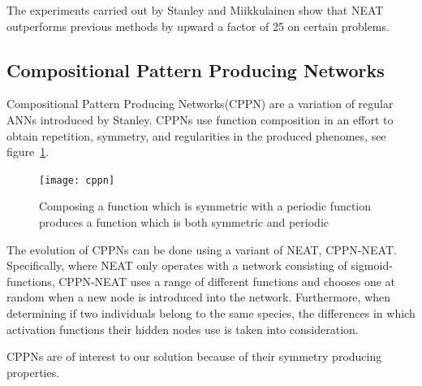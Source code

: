 The experiments carried out by Stanley and Miikkulainen show that NEAT 
outperforms previous methods by upward a factor of 
25 on certain problems\cite[p.~2]{stanley2002evolving}.
\subsection{Compositional Pattern Producing Networks}
\label{sec:cppn}
Compositional Pattern Producing Networks(CPPN) are a variation of regular ANNs 
introduced by 
Stanley\cite{Stanley2007}.
CPPNs use function composition in an effort to obtain repetition, symmetry, and 
regularities in the produced phenomes, see figure~\ref{fig:cppn}.
\begin{figure}[ht]
\centering
\texttt{[image: cppn]}
\caption{Composing a function which is symmetric with a periodic function 
produces a function which is both symmetric and periodic \cite{Stanley2007}}
\label{fig:cppn}
\end{figure}

The evolution of CPPNs can be done using a variant of NEAT, 
CPPN-NEAT.
Specifically, where NEAT only operates with a network consisting of 
sigmoid-functions, CPPN-NEAT uses a range of different functions and chooses 
one at random when a new node is introduced into the network.
Furthermore, when determining if two individuals belong to the same species, 
the differences in which activation functions their hidden nodes use is taken 
into consideration.

CPPNs are of interest to our solution because of their symmetry producing 
properties.

